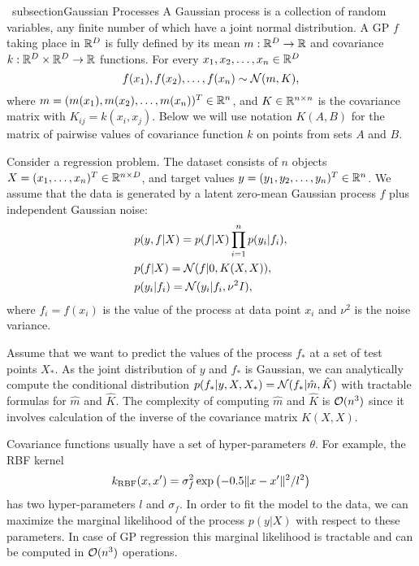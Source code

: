 ~subsection{Gaussian Processes}
  A Gaussian process is a collection of random variables, any finite number of
  which have a joint normal distribution. A GP $f$ taking place in $\mathbb{R}^D$ is
  fully defined by its mean $m: \mathbb{R}^D \rightarrow \mathbb{R}$ and covariance
  $k: \mathbb{R}^D \times \mathbb{R}^D \rightarrow \mathbb{R}$ functions. For every $x_1, x_2, \ldots, x_n \in \mathbb{R}^D$
  \[
    f(x_1), f(x_2), \ldots, f(x_n) \sim \mathcal{N}(m, K),
  \]
  where $m = (m(x_1), m(x_2), \ldots, m(x_n))^T \in \mathbb{R}^n$, and
  $K\in \mathbb{R}^{n \times n}$ is the covariance matrix with $K_{ij}=k(x_i,x_j)$. Below we will use notation $K(A, B)$ for the matrix of pairwise
  values of covariance function $k$ on points from sets $A$ and $B$.

  Consider a regression problem. The dataset consists of
  $n$ objects $X = (x_1, \ldots, x_n)^T \in \mathbb{R}^{n \times D}$, and target values
  $y = (y_1, y_2, \ldots, y_n)^T \in \mathbb{R}^n$. We assume that the data is
  generated by a latent zero-mean Gaussian process $f$ plus independent Gaussian noise:
  \begin{equation}
    \begin{split}
      &p(y,f | X) = p(f | X)\prod_{i=1}^np(y_i | f_i),\\
      &p(f | X) = \mathcal{N}(f | 0, K(X,X)), \\
      &p(y_i | f_i) = \mathcal{N}(y_i | f_i, \nu^2 I),\\
    \end{split}
    \label{gp_model}
  \end{equation}
  where $f_i=f(x_i)$ is the value of the process at data point $x_i$ and $\nu^2$ is the noise variance.

  Assume that we want to predict the values of the process $f_*$ at a set of test
  points $X_*$. As the joint distribution of $y$ and $f_*$ is Gaussian, we can analytically
  compute the conditional distribution $p(f_* | y, X, X_*) = \mathcal{N}(f_*|\hat{m},\hat{K})$ 
  with tractable formulas for $\hat{m}$ and $\hat{K}$. The complexity of computing
  $\hat m$ and $\hat K$ is $\mathcal{O}(n^3)$ since it involves calculation of the 
  inverse of the covariance matrix $K(X, X)$.
  
  Covariance functions usually have a set of hyper-parameters $\theta$. For example, the RBF kernel
  \[
    k_{\mbox{\scriptsize RBF}} (x, x') = \sigma_f^2 \exp\left(- 0.5 \Vert x - x'\Vert^2 / l^2 \right)
  \]
  has two hyper-parameters $l$ and $\sigma_f$. In order to fit the model to the data,
  we can maximize the marginal likelihood of the process $p(y|X)$ with respect to these
  parameters. In case of GP regression this marginal likelihood is tractable and
  can be computed in $\mathcal{O}(n^3)$ operations.

